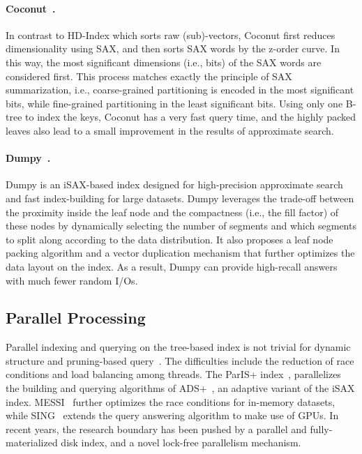 \documentclass[11pt]{article}
\begin{document}
\paragraph{Coconut~\cite{coconut}.}
In contrast to HD-Index which sorts raw (sub)-vectors, Coconut first reduces dimensionality using SAX, and then sorts SAX words by the z-order curve.
In this way, the most significant dimensions (i.e., bits) of the SAX words are considered first.
This process matches exactly the principle of SAX summarization, i.e., coarse-grained partitioning is encoded in the most significant bits, while fine-grained partitioning in the least significant bits. 
Using only one B-tree to index the keys, Coconut has a very fast query time, and the highly packed leaves also lead to a small improvement in the results of approximate search.

\paragraph{Dumpy~\cite{dumpy}.}
Dumpy is an iSAX-based index designed for high-precision approximate search and fast index-building for large datasets.
Dumpy leverages the trade-off between the proximity inside the leaf node and the compactness (i.e., the fill factor) of these nodes by dynamically selecting the number of segments and which segments to split along according to the data distribution.
It also proposes a leaf node packing algorithm and a vector duplication mechanism that further optimizes the data layout on the index.
As a result, Dumpy can provide high-recall answers with much fewer random I/Os. %


\subsection{Parallel Processing}
Parallel indexing and querying on the tree-based index is not trivial for dynamic structure and pruning-based query~\cite{paris,messi}.
The difficulties include the reduction of race conditions and load balancing among threads.
The ParIS+ index~\cite{paris}, parallelizes the building and querying algorithms of ADS+~\cite{ads}, an adaptive variant of the iSAX index.
MESSI~\cite{messi} further optimizes the race conditions for in-memory datasets, while SING~\cite{sing} extends the query answering algorithm to make use of GPUs.
In recent years, the research boundary has been pushed by a parallel and fully-materialized disk index, and a novel lock-free parallelism mechanism.
\end{document}
